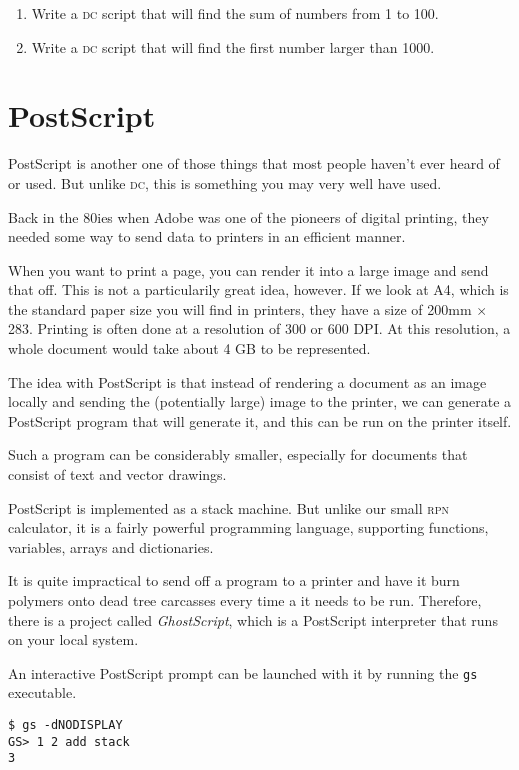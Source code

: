 \documentclass[a4paper,twocolumn]{article}
\begin{document}
\begin{enumerate}
  \item Write a \textsc{dc} script that will find the sum of numbers from 1 to 100.
  \item Write a \textsc{dc} script that will find the first number larger than 1000.
\end{enumerate}

\section{PostScript}

PostScript is another one of those things that most people haven't ever heard of or used. But unlike \textsc{dc}, this is something you may very well have used.

Back in the 80ies when Adobe was one of the pioneers of digital printing, they needed some way to send data to printers in an efficient manner.

When you want to print a page, you can render it into a large image and send that off. This is not a particularily great idea, however. If we look at A4, which is the standard paper size you will find in printers, they have a size of 200mm $\times$ 283. Printing is often done at a resolution of 300 or 600 DPI. At this resolution, a whole document would take about 4 GB to be represented.

The idea with PostScript is that instead of rendering a document as an image locally and sending the (potentially large) image to the printer, we can generate a PostScript program that will generate it, and this can be run on the printer itself.

Such a program can be considerably smaller, especially for documents that consist of text and vector drawings.

PostScript is implemented as a stack machine. But unlike our small \textsc{rpn} calculator, it is a fairly powerful programming language, supporting functions, variables, arrays and dictionaries.

It is quite impractical to send off a program to a printer and have it burn polymers onto dead tree carcasses every time a it needs to be run. Therefore, there is a project called \emph{GhostScript}, which is a PostScript interpreter that runs on your local system.

An interactive PostScript prompt can be launched with it by running the \verb|gs| executable.\cite{bluebook1985}

\begin{verbatim}
$ gs -dNODISPLAY
GS> 1 2 add stack
3
\end{verbatim}
\end{document}
